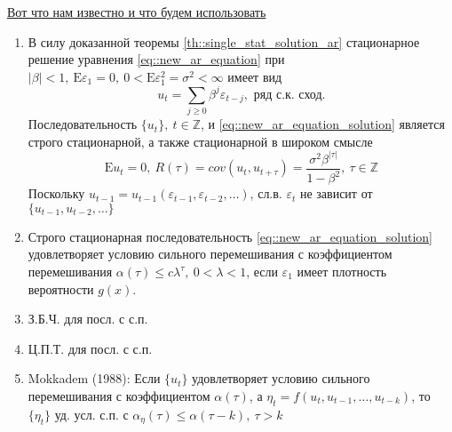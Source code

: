 \documentclass[12pt]{article}
\def\eps{ \varepsilon }
\def\Z{ \mathbb{Z} }
\def\E{ \mathrm{E} }
\begin{document}
\underline{Вот что нам известно и что будем использовать}
\begin{enumerate}
    \item В силу доказанной теоремы \ref{th::single_stat_solution_ar} стационарное
    решение уравнения \eqref{eq::new_ar_equation} при $\left\lvert \beta\right\rvert <1,\ \E\eps_1=0,\ 0<\E\eps^2_1=\sigma^2<\infty$
    имеет вид
    \begin{equation}\label{eq::new_ar_equation_solution}
        u_t=\sum_{j\geq0}\beta^j\eps_{t-j},\text{ ряд с.к. сход.}
    \end{equation}
    Последовательность $\{u_t\},\ t\in\Z$, и \eqref{eq::new_ar_equation_solution}
    является строго стационарной, а также стационарной в широком смысле
    \[\E u_t=0,\ R(\tau)=cov(u_t,u_{t+\tau})=\frac{\sigma^2\beta^{\left\lvert \tau\right\rvert }}{1-\beta^2},\ \tau\in\Z\]
    Поскольку $u_{t-1} = u_{t-1}(\eps_{t-1},\eps_{t-2},\ldots)$, сл.в. $\eps_t$ не зависит от $\{u_{t-1},u_{t-2},\ldots\}$
    \item Строго стационарная последовательность \eqref{eq::new_ar_equation_solution} удовлетворяет
    условию сильного перемешивания с коэффициентом перемешивания $\alpha(\tau)\leq c\lambda^{\tau},\ 0<\lambda<1$,
    если $\eps_1$ имеет плотность вероятности $g(x)$.
    \item З.Б.Ч. для посл. с с.п.
    \item Ц.П.Т. для посл. с с.п.
    \item Mokkadem (1988): Если $\{u_t\}$ удовлетворяет условию сильного перемешивания с коэффициентом $\alpha(\tau)$,
    а $\eta_t=f(u_t,u_{t-1},\ldots,u_{t-k})$, то $\{\eta_t\}$ уд. усл. с.п. с $\alpha_\eta(\tau)\leq\alpha(\tau-k),\ \tau>k$
\end{enumerate}
\end{document}
